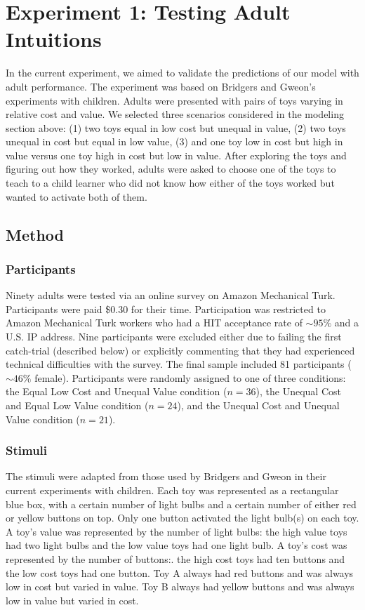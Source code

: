 \documentclass[10pt,letterpaper]{article}
\begin{document}
\section{Experiment 1: Testing Adult Intuitions}

In the current experiment, we aimed to validate the predictions of our model with adult performance. The experiment was based on Bridgers and Gweon's experiments with children. Adults were presented with pairs of toys varying in relative cost and value. We selected three scenarios considered in the modeling section above: (1) two toys equal in low cost but unequal in value, (2) two toys unequal in cost but equal in low value, (3) and one toy low in cost but high in value versus one toy high in cost but low in value. After exploring the toys and figuring out how they worked, adults were asked to choose one of the toys to teach to a child learner who did not know how either of the toys worked but wanted to activate both of them. 

\subsection{Method}

\subsubsection{Participants}

Ninety adults were tested via an online survey on Amazon Mechanical Turk. Participants were paid \$0.30 for their time. Participation was restricted to Amazon Mechanical Turk workers who had a HIT acceptance rate of $\sim 95\%$ and a U.S. IP address. Nine participants were excluded either due to failing the first catch-trial (described below) or explicitly commenting that they had experienced technical difficulties with the survey. The final sample included 81 participants ($\sim 46\%$ female). Participants were randomly assigned to one of three conditions: the Equal Low Cost and Unequal Value condition ($n = 36$), the Unequal Cost and Equal Low Value condition ($n = 24$), and the Unequal Cost and Unequal Value condition ($n = 21$). 

\subsubsection{Stimuli}

The stimuli were adapted from those used by Bridgers and Gweon in their current experiments with children. Each toy was represented as a rectangular blue box, with a certain number of light bulbs and a certain number of either red or yellow buttons on top. Only one button activated the light bulb(s) on each toy. A toy's value was represented by the number of light bulbs: the high value toys had two light bulbs and the low value toys had one light bulb. A toy's cost was represented by the number of buttons:. the high cost toys had ten buttons and the low cost toys had one button. Toy A always had red buttons and was always low in cost but varied in value. Toy B always had yellow buttons and was always low in value but varied in cost.
\end{document}
